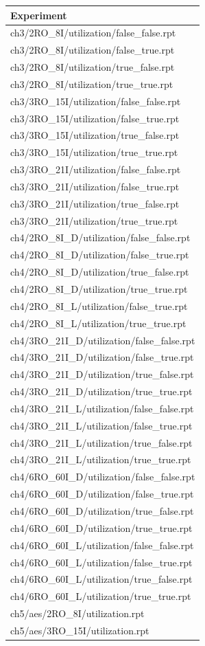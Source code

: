 \begin{tabular}{l}
\hline
Experiment \\
\hline
ch3/2RO\_8I/utilization/false\_false.rpt &  \\
ch3/2RO\_8I/utilization/false\_true.rpt &  \\
ch3/2RO\_8I/utilization/true\_false.rpt &  \\
ch3/2RO\_8I/utilization/true\_true.rpt &  \\
ch3/3RO\_15I/utilization/false\_false.rpt &  \\
ch3/3RO\_15I/utilization/false\_true.rpt &  \\
ch3/3RO\_15I/utilization/true\_false.rpt &  \\
ch3/3RO\_15I/utilization/true\_true.rpt &  \\
ch3/3RO\_21I/utilization/false\_false.rpt &  \\
ch3/3RO\_21I/utilization/false\_true.rpt &  \\
ch3/3RO\_21I/utilization/true\_false.rpt &  \\
ch3/3RO\_21I/utilization/true\_true.rpt &  \\
ch4/2RO\_8I\_D/utilization/false\_false.rpt &  \\
ch4/2RO\_8I\_D/utilization/false\_true.rpt &  \\
ch4/2RO\_8I\_D/utilization/true\_false.rpt &  \\
ch4/2RO\_8I\_D/utilization/true\_true.rpt &  \\
ch4/2RO\_8I\_L/utilization/false\_true.rpt &  \\
ch4/2RO\_8I\_L/utilization/true\_true.rpt &  \\
ch4/3RO\_21I\_D/utilization/false\_false.rpt &  \\
ch4/3RO\_21I\_D/utilization/false\_true.rpt &  \\
ch4/3RO\_21I\_D/utilization/true\_false.rpt &  \\
ch4/3RO\_21I\_D/utilization/true\_true.rpt &  \\
ch4/3RO\_21I\_L/utilization/false\_false.rpt &  \\
ch4/3RO\_21I\_L/utilization/false\_true.rpt &  \\
ch4/3RO\_21I\_L/utilization/true\_false.rpt &  \\
ch4/3RO\_21I\_L/utilization/true\_true.rpt &  \\
ch4/6RO\_60I\_D/utilization/false\_false.rpt &  \\
ch4/6RO\_60I\_D/utilization/false\_true.rpt &  \\
ch4/6RO\_60I\_D/utilization/true\_false.rpt &  \\
ch4/6RO\_60I\_D/utilization/true\_true.rpt &  \\
ch4/6RO\_60I\_L/utilization/false\_false.rpt &  \\
ch4/6RO\_60I\_L/utilization/false\_true.rpt &  \\
ch4/6RO\_60I\_L/utilization/true\_false.rpt &  \\
ch4/6RO\_60I\_L/utilization/true\_true.rpt &  \\
ch5/aes/2RO\_8I/utilization.rpt &  \\
ch5/aes/3RO\_15I/utilization.rpt &  \\
\hline
\end{tabular}
